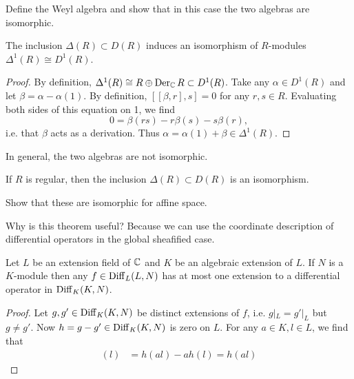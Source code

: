 \begin{example}
    Define the Weyl algebra and show that in this case the two algebras are
    isomorphic.
\end{example}

\begin{lemma}
    The inclusion $\Delta(R)\subset D(R)$ induces an isomorphism of
    $R$-modules $\Delta^1(R)\cong D^1(R)$.
    \label{label:firstorder}
\end{lemma}
\begin{proof}
    By definition, $\Delta^1(R)\cong R\oplus\operatorname{Der}_{\mathbb{C}} R\subset D^1(R)$. Take any $\alpha\in D^1(R)$
    and let $\beta=\alpha-\alpha(1)$. By definition, $[ [\beta,r],s]=0$ for any $r,s\in R$.
    Evaluating both sides of this equation on 1, we find
    \[0 = \beta(rs)-r\beta(s)-s\beta(r),\]
    i.e. that $\beta$ acts as a derivation. Thus $\alpha=\alpha(1)+\beta\in\Delta^1(R)$.
\end{proof}

\begin{example}
    In general, the two algebras are not isomorphic.
\end{example}

\begin{theorem}
    If $R$ is regular, then the inclusion $\Delta(R)\subset D(R)$ is an isomorphism.
    \label{label:derivationiso}
\end{theorem}

\begin{example}
    Show that these are isomorphic for affine space.
\end{example}

Why is this theorem useful? Because we can use the coordinate description of differential
operators in the global sheafified case.

\begin{lemma}
    Let $L$ be an extension field of $\mathbb{C}$ and $K$ be an algebraic extension of $L$. If
    $N$ is a $K$-module then any $f\in\operatorname{Diff}_L(L,N)$ has at most one extension to a
    differential operator in $\operatorname{Diff}_K(K,N)$.
    \label{lemma:hart1}
\end{lemma}
\begin{proof}
Let $g,g'\in\operatorname{Diff}_K(K,N)$ be distinct extensions of $f$, i.e. $g|_L=g'|_L$
but $g\neq g'$. Now $h=g-g'\in\operatorname{Diff}_K(K,N)$ is zero on $L$. For any $a\in K,l\in L$,
we find that
\begin{align*}
    [h,a](l) &= h(al)-ah(l) = h(al)
\end{align*}
\end{proof}

